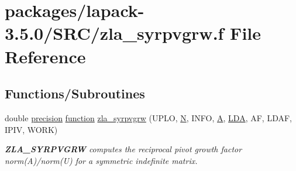 \hypertarget{zla__syrpvgrw_8f}{}\section{packages/lapack-\/3.5.0/\+S\+R\+C/zla\+\_\+syrpvgrw.f File Reference}
\label{zla__syrpvgrw_8f}
\subsection*{Functions/\+Subroutines}
\begin{DoxyCompactItemize}
\item 
double \hyperlink{numinquire_8h_a2c8e616467665d0b2814d4c1589ba74e}{precision} \hyperlink{afunc_8m_a7b5e596df91eadea6c537c0825e894a7}{function} \hyperlink{group__complex16SYcomputational_ga1f52f6bba69bfbed88e4a53e3c3cf0da}{zla\+\_\+syrpvgrw} (U\+P\+L\+O, \hyperlink{polmisc_8c_a0240ac851181b84ac374872dc5434ee4}{N}, I\+N\+F\+O, \hyperlink{classA}{A}, \hyperlink{example__user_8c_ae946da542ce0db94dced19b2ecefd1aa}{L\+D\+A}, A\+F, L\+D\+A\+F, I\+P\+I\+V, W\+O\+R\+K)
\begin{DoxyCompactList}\small\item\em {\bfseries Z\+L\+A\+\_\+\+S\+Y\+R\+P\+V\+G\+R\+W} computes the reciprocal pivot growth factor norm(\+A)/norm(U) for a symmetric indefinite matrix. \end{DoxyCompactList}\end{DoxyCompactItemize}
